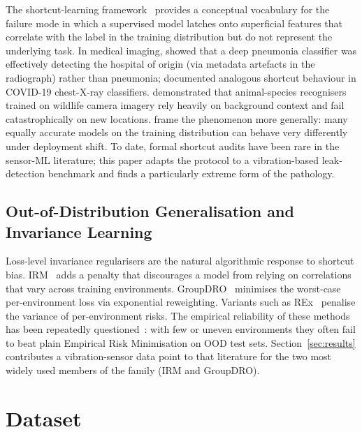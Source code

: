 \documentclass[sensors,article,submit,pdftex,oneauthor]{Definitions/mdpi}
\begin{document}
The shortcut-learning framework~\cite{geirhos2020shortcut}
provides a conceptual vocabulary for the failure mode in which
a supervised model latches onto superficial features that
correlate with the label in the training distribution but do
not represent the underlying task. In medical imaging,
\citet{zech2018pneumonia} showed that a deep pneumonia
classifier was effectively detecting the hospital of origin
(via metadata artefacts in the radiograph) rather than
pneumonia; \citet{degrave2021covid} documented analogous
shortcut behaviour in COVID-19 chest-X-ray classifiers.
\citet{beery2018terra} demonstrated that animal-species
recognisers trained on wildlife camera imagery rely heavily on
background context and fail catastrophically on new locations.
\citet{damour2022underspec} frame the phenomenon more
generally: many equally accurate models on the training
distribution can behave very differently under deployment
shift. To date, formal shortcut audits have been rare in the
sensor-ML literature; this paper adapts the protocol to a
vibration-based leak-detection benchmark and finds a particularly
extreme form of the pathology.

\subsection{Out-of-Distribution Generalisation and Invariance Learning}

Loss-level invariance regularisers are the natural algorithmic
response to shortcut bias.
IRM~\cite{arjovsky2019irm} adds a penalty that discourages a
model from relying on correlations that vary across training
environments. GroupDRO~\cite{sagawa2020groupdro} minimises the
worst-case per-environment loss via exponential reweighting.
Variants such as REx~\cite{krueger2021rex} penalise the
variance of per-environment risks. The empirical reliability
of these methods has been repeatedly
questioned~\cite{gulrajani2021dg,rosenfeld2021irm}: with few
or uneven environments they often fail to beat plain Empirical
Risk Minimisation on OOD test sets. Section~\ref{sec:results}
contributes a vibration-sensor data point to that literature
for the two most widely used members of the family (IRM and
GroupDRO).

\section{Dataset}\label{sec:data}
\end{document}
